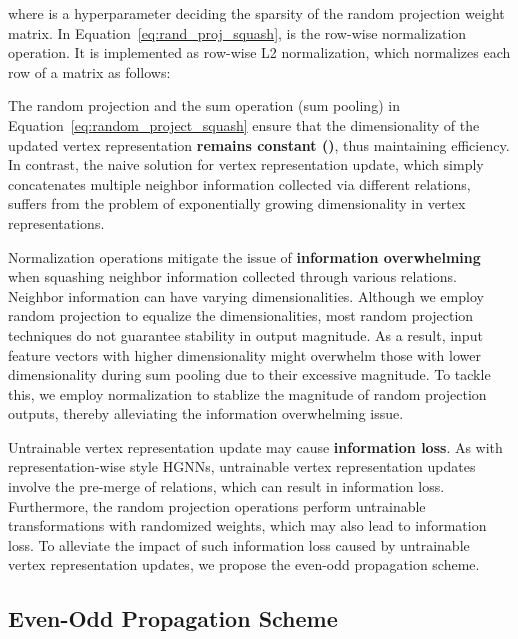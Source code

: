 \documentclass[lettersize,journal]{IEEEtran}
\begin{document}
where  is a hyperparameter deciding the sparsity of the random projection weight matrix.
In Equation~\ref{eq:rand_proj_squash},  is the row-wise normalization operation.
It is implemented as row-wise L2 normalization, which normalizes each row  of a matrix as follows:

The random projection and the sum operation (sum pooling) in Equation~\ref{eq:random_project_squash} ensure that the dimensionality of the updated vertex representation \textbf{remains constant ()}, thus maintaining efficiency.
In contrast, the naive solution for vertex representation update, which simply concatenates multiple neighbor information collected via different relations, suffers from the problem of exponentially growing dimensionality in vertex representations.






Normalization operations mitigate the issue of \textbf{information overwhelming} when squashing neighbor information collected through various relations. 
Neighbor information can have varying dimensionalities. 
Although we employ random projection to equalize the dimensionalities, most random projection techniques do not guarantee stability in output magnitude. 
As a result, input feature vectors with higher dimensionality might overwhelm those with lower dimensionality during sum pooling due to their excessive magnitude. 
To tackle this, we employ normalization to stablize the magnitude of random projection outputs, thereby alleviating the information overwhelming issue.





Untrainable vertex representation update may cause \textbf{information loss}.
As with representation-wise style HGNNs, untrainable vertex representation updates involve the pre-merge of relations, which can result in information loss.
Furthermore, the random projection operations perform untrainable transformations with randomized weights, which may also lead to information loss.
To alleviate the impact of such information loss caused by untrainable vertex representation updates, we propose the even-odd propagation scheme.







\subsection{Even-Odd Propagation Scheme}\label{sec:even_odd_prop}
\end{document}

